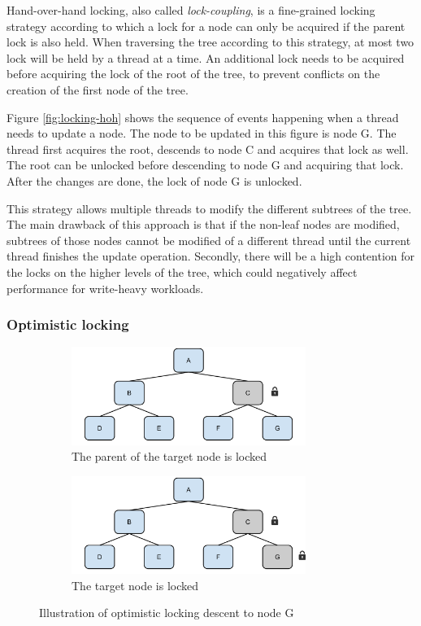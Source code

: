 \documentclass[11pt,a4paper]{globis-book}
\begin{document}
Hand-over-hand locking, also called \textit{lock-coupling}, is a fine-grained locking strategy according to which a lock for a node can only be acquired if the parent lock is also held. When traversing the tree according to this strategy, at most two lock will be held by a thread at a time. An additional lock needs to be acquired before acquiring the lock of the root of the tree, to prevent conflicts on the creation of the first node of the tree. 

Figure \ref{fig:locking-hoh} shows the sequence of events happening when a thread needs to update a node. The node to be updated in this figure is node G. The thread first acquires the root, descends to node C and acquires that lock as well. The root can be unlocked before descending to node G and acquiring that lock. After the changes are done, the lock of node G is unlocked.

This strategy allows multiple threads to modify the different subtrees of the tree. The main drawback of this approach is that if the non-leaf nodes are modified, subtrees of those nodes cannot be modified of a different thread until the current thread finishes the update operation. Secondly, there will be a high contention for the locks on the higher levels of the tree, which could negatively affect performance for write-heavy workloads. 

\subsubsection{Optimistic locking}

\begin{figure}
    \centering
    \begin{subfigure}[b]{0.5\linewidth}
        \includegraphics[width = 3in]{images/Tree-HoH-c}
        \caption{The parent of the target node is locked}
    \end{subfigure}%
    \begin{subfigure}[b]{0.5\linewidth}
        \includegraphics[width = 3in]{images/Tree-HoH-d}
        \caption{The target node is locked}
    \end{subfigure}
    \caption{Illustration of optimistic locking descent to node G}
\end{figure}
\end{document}
